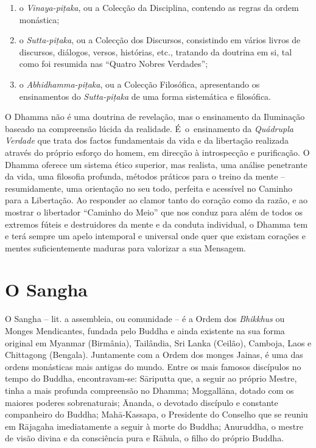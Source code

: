 \begin{enumerate}
  \item o \emph{Vinaya-piṭaka}, ou a Colecção da Disciplina, contendo as regras
        da ordem monástica;

  \item o \emph{Sutta-piṭaka}, ou a Colecção dos Discursos, consistindo em
        vários livros de discursos, diálogos, versos, histórias, etc., tratando
        da doutrina em si, tal como foi resumida nas ``Quatro Nobres Verdades'';

  \item o \emph{Abhidhamma-piṭaka}, ou a Colecção Filosófica, apresentando os
        ensinamentos do \emph{Sutta-piṭaka} de uma forma sistemática e
        filosófica.
\end{enumerate}

O Dhamma não é uma doutrina de revelação, mas o ensinamento da Iluminação
baseado na compreensão lúcida da realidade. É~o~ensinamento da \emph{Quádrupla
  Verdade} que trata dos factos fundamentais da vida e da libertação realizada
através do próprio esforço do homem, em direcção à introspecção e purificação. O
Dhamma oferece um sistema ético superior, mas realista, uma análise
penetrante da vida, uma filosofia profunda, métodos práticos para o treino da
mente -- resumidamente, uma orientação no seu todo, perfeita e acessível no
Caminho para a Libertação. Ao responder ao clamor tanto do coração como da
razão, e ao mostrar o libertador ``Caminho do Meio'' que nos conduz para além de
todos os extremos fúteis e destruidores da mente e da conduta individual, o
Dhamma tem e terá sempre um apelo intemporal e universal onde quer que
existam corações e mentes suficientemente maduras para valorizar a sua Mensagem.

\section{O Sangha}

O Sangha -- lit. a assembleia, ou comunidade -- é a Ordem dos \emph{Bhikkhus} ou
Monges Mendicantes, fundada pelo Buddha e ainda existente na sua forma original
em Myanmar (Birmânia), Tailândia, Sri Lanka (Ceilão), Camboja, Laos e Chittagong
(Bengala). Juntamente com a Ordem dos monges Jainas, é uma das ordens monásticas
mais antigas do mundo. Entre os mais famosos discípulos no tempo do Buddha,
encontravam-se: Sāriputta que, a seguir ao próprio Mestre, tinha a mais profunda
compreensão no Dhamma; Moggallāna, dotado com os maiores poderes
\mbox{sobrenaturais}; Ānanda, o devotado discípulo e constante companheiro do Buddha;
Mahā-Kassapa, o Presidente do Conselho que se reuniu em Rājagaha imediatamente a
seguir à morte do Buddha; Anuruddha, o mestre de visão divina e da consciência
pura e Rāhula, o filho do próprio Buddha.

